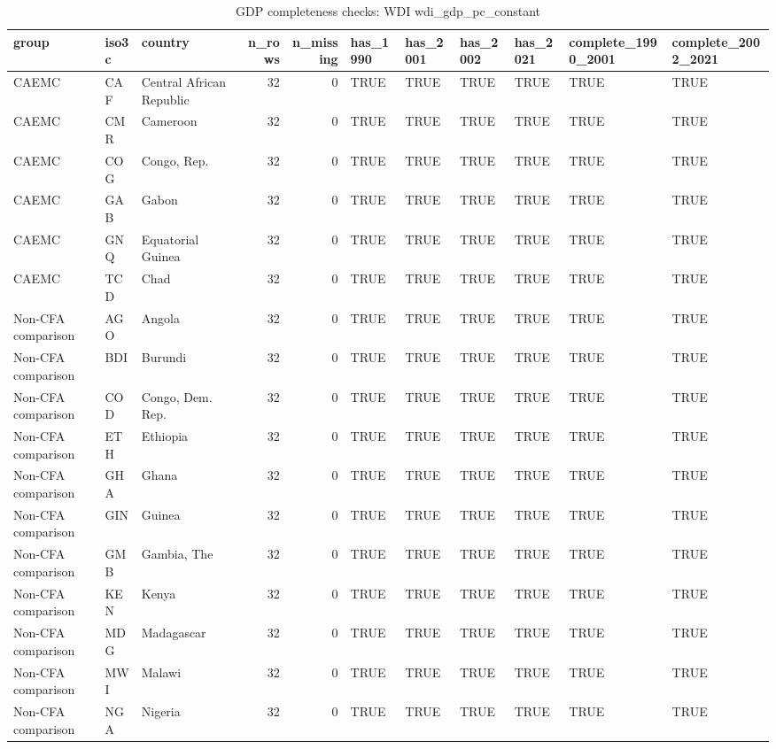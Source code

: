 \begin{table}

\caption{GDP completeness checks: WDI wdi_gdp_pc_constant}
\centering
\begin{tabular}[t]{lllrrllllll}
\toprule
group & iso3c & country & n\_rows & n\_missing & has\_1990 & has\_2001 & has\_2002 & has\_2021 & complete\_1990\_2001 & complete\_2002\_2021\\
\midrule
CAEMC & CAF & Central African Republic & 32 & 0 & TRUE & TRUE & TRUE & TRUE & TRUE & TRUE\\
CAEMC & CMR & Cameroon & 32 & 0 & TRUE & TRUE & TRUE & TRUE & TRUE & TRUE\\
CAEMC & COG & Congo, Rep. & 32 & 0 & TRUE & TRUE & TRUE & TRUE & TRUE & TRUE\\
CAEMC & GAB & Gabon & 32 & 0 & TRUE & TRUE & TRUE & TRUE & TRUE & TRUE\\
CAEMC & GNQ & Equatorial Guinea & 32 & 0 & TRUE & TRUE & TRUE & TRUE & TRUE & TRUE\\
\addlinespace
CAEMC & TCD & Chad & 32 & 0 & TRUE & TRUE & TRUE & TRUE & TRUE & TRUE\\
Non-CFA comparison & AGO & Angola & 32 & 0 & TRUE & TRUE & TRUE & TRUE & TRUE & TRUE\\
Non-CFA comparison & BDI & Burundi & 32 & 0 & TRUE & TRUE & TRUE & TRUE & TRUE & TRUE\\
Non-CFA comparison & COD & Congo, Dem. Rep. & 32 & 0 & TRUE & TRUE & TRUE & TRUE & TRUE & TRUE\\
Non-CFA comparison & ETH & Ethiopia & 32 & 0 & TRUE & TRUE & TRUE & TRUE & TRUE & TRUE\\
\addlinespace
Non-CFA comparison & GHA & Ghana & 32 & 0 & TRUE & TRUE & TRUE & TRUE & TRUE & TRUE\\
Non-CFA comparison & GIN & Guinea & 32 & 0 & TRUE & TRUE & TRUE & TRUE & TRUE & TRUE\\
Non-CFA comparison & GMB & Gambia, The & 32 & 0 & TRUE & TRUE & TRUE & TRUE & TRUE & TRUE\\
Non-CFA comparison & KEN & Kenya & 32 & 0 & TRUE & TRUE & TRUE & TRUE & TRUE & TRUE\\
Non-CFA comparison & MDG & Madagascar & 32 & 0 & TRUE & TRUE & TRUE & TRUE & TRUE & TRUE\\
\addlinespace
Non-CFA comparison & MWI & Malawi & 32 & 0 & TRUE & TRUE & TRUE & TRUE & TRUE & TRUE\\
Non-CFA comparison & NGA & Nigeria & 32 & 0 & TRUE & TRUE & TRUE & TRUE & TRUE & TRUE\\

\end{tabular}
\end{table}
